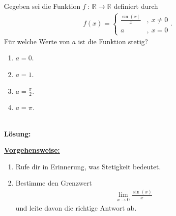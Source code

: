 \newpage

\subsection*{}
Gegeben sei die Funktion $f \ : \ \mathbb{R} \to \mathbb{R}$ definiert durch
\begin{align*}
f(x) 
= 
\begin{cases}
\frac{\sin(x)}{x}& , \ x \neq 0\\
a& ,		\  x = 0
\end{cases}.
\end{align*}
Für welche Werte von $a$ ist die Funktion stetig?
\begin{enumerate}
\item $a=0$.
\item $a=1$.
\item $a = \frac{\pi}{2}$.
\item $a = \pi$.
\end{enumerate}
\ \\
\textbf{Lösung:}
\begin{mdframed}
\underline{\textbf{Vorgehensweise:}}
\renewcommand{\labelenumi}{\theenumi.}
\begin{enumerate}
\item Rufe dir in Erinnerung, was Stetigkeit bedeutet.
\item Bestimme den Grenzwert
\begin{align*}
\lim \limits_{x \rightarrow 0} \frac{\sin(x)}{x}
\end{align*}
und leite  davon die richtige Antwort ab.
\end{enumerate}
\end{mdframed}

